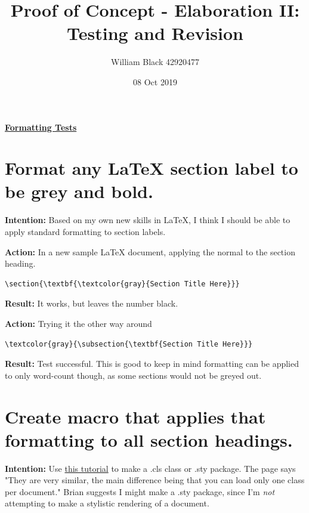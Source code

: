 \documentclass[12pt]{article}
\title{\textbf{Proof of Concept - Elaboration II: Testing and Revision}}
\date{08 Oct 2019}
\author{William Black 42920477}
\begin{document}
\underline{\textbf{\Large{Formatting Tests}}}

\section{\large Format any LaTeX section label to be grey and bold.}

\textbf{Intention:} Based on my own new skills in LaTeX, I think I should be able to apply standard formatting to section labels.

\textbf{Action:} In a new sample LaTeX document, applying the normal to the section heading. \vspace{-0.5em}\begin{verbatim}
\section{\textbf{\textcolor{gray}{Section Title Here}}}    \end{verbatim}\vspace{-0.5em}

\textbf{Result:} It works, but leaves the number black. 

\textbf{Action:} Trying it the other way around
\vspace{-0.5em}\begin{verbatim}
\textcolor{gray}{\subsection{\textbf{Section Title Here}}}  \end{verbatim}\vspace{-0.5em}

\textbf{Result:} Test successful. This is good to keep in mind formatting can be applied to only word-count though, as some sections would not be greyed out.

\section{\large Create macro that applies that formatting to all section headings.}

\textbf{Intention:} Use \href{https://en.wikibooks.org/wiki/LaTeX/Creating_Packages}{this tutorial} to make a .cls class or .sty package. The page says "They are very similar, the main difference being that you can load only one class per document." Brian suggests I might make a .sty package, since I'm \textit{not} attempting to make a stylistic rendering of a document.
\end{document}

